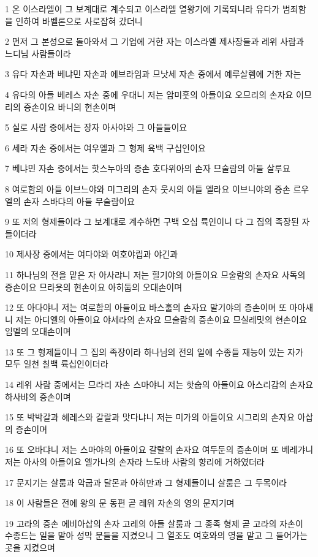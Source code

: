 \par 1 온 이스라엘이 그 보계대로 계수되고 이스라엘 열왕기에 기록되니라 유다가 범죄함을 인하여 바벨론으로 사로잡혀 갔더니
\par 2 먼저 그 본성으로 돌아와서 그 기업에 거한 자는 이스라엘 제사장들과 레위 사람과 느디님 사람들이라
\par 3 유다 자손과 베냐민 자손과 에브라임과 므낫세 자손 중에서 예루살렘에 거한 자는
\par 4 유다의 아들 베레스 자손 중에 우대니 저는 암미훗의 아들이요 오므리의 손자요 이므리의 증손이요 바니의 현손이며
\par 5 실로 사람 중에서는 장자 아사야와 그 아들들이요
\par 6 세라 자손 중에서는 여우엘과 그 형제 육백 구십인이요
\par 7 베냐민 자손 중에서는 핫스누아의 증손 호다위아의 손자 므술람의 아들 살루요
\par 8 여로함의 아들 이브느야와 미그리의 손자 웃시의 아들 엘라요 이브니야의 증손 르우엘의 손자 스바댜의 아들 무술람이요
\par 9 또 저의 형제들이라 그 보계대로 계수하면 구백 오십 륙인이니 다 그 집의 족장된 자들이더라
\par 10 제사장 중에서는 여다야와 여호야립과 야긴과
\par 11 하나님의 전을 맡은 자 아사랴니 저는 힐기야의 아들이요 므술람의 손자요 사독의 증손이요 므라욧의 현손이요 아히둡의 오대손이며
\par 12 또 아다야니 저는 여로함의 아들이요 바스훌의 손자요 말기야의 증손이며 또 마아새니 저는 아디엘의 아들이요 야세라의 손자요 므술람의 증손이요 므실레밋의 현손이요 임멜의 오대손이며
\par 13 또 그 형제들이니 그 집의 족장이라 하나님의 전의 일에 수종들 재능이 있는 자가 모두 일천 칠백 륙십인이더라
\par 14 레위 사람 중에서는 므라리 자손 스마야니 저는 핫숩의 아들이요 아스리감의 손자요 하사뱌의 증손이며
\par 15 또 박박갈과 헤레스와 갈랄과 맛다냐니 저는 미가의 아들이요 시그리의 손자요 아삽의 증손이며
\par 16 또 오바댜니 저는 스마야의 아들이요 갈랄의 손자요 여두둔의 증손이며 또 베레갸니 저는 아사의 아들이요 엘가나의 손자라 느도바 사람의 향리에 거하였더라
\par 17 문지기는 살룸과 악굽과 달몬과 아히만과 그 형제들이니 살룸은 그 두목이라
\par 18 이 사람들은 전에 왕의 문 동편 곧 레위 자손의 영의 문지기며
\par 19 고라의 증손 에비아삽의 손자 고레의 아들 살룸과 그 종족 형제 곧 고라의 자손이 수종드는 일을 맡아 성막 문들을 지켰으니 그 열조도 여호와의 영을 맡고 그 들어가는 곳을 지켰으며
